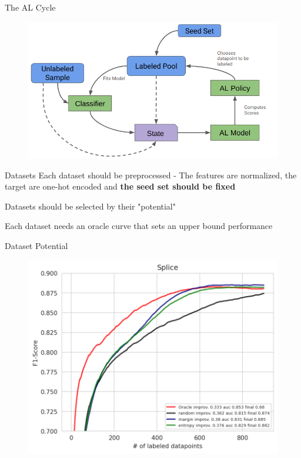 \documentclass[aspectratio=169, 11pt, invertlogo]{ismll-slides}
\begin{document}
\begin{frame}[fragile]{The AL Cycle}
	\begin{figure}
		\centering
		\includegraphics[width=\linewidth]{pics/al_cycle.png}
	\end{figure}
\end{frame}


\begin{frame}[fragile]{Datasets}
	Each dataset should be preprocessed - The features are normalized, the target are one-hot encoded and \textbf{the seed set should be fixed}
	
	Datasets should be selected by their "potential"
	
	Each dataset needs an oracle curve that sets an upper bound performance
\end{frame}


\begin{frame}[fragile]{Dataset Potential}
	\begin{figure}
		\centering
		\includegraphics[width=0.7\linewidth]{pics/splice_oracle.png}
	\end{figure}
\end{frame}
\end{document}
